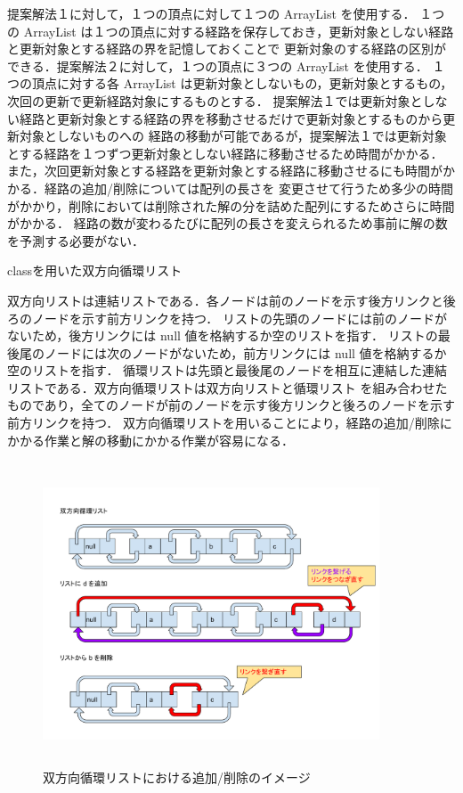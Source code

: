 \documentclass[12pt]{optlab-bachelor}
\begin{document}
提案解法１に対して，１つの頂点に対して１つの ArrayList を使用する．
１つの ArrayList は１つの頂点に対する経路を保存しておき，更新対象としない経路と更新対象とする経路の界を記憶しておくことで
更新対象のする経路の区別ができる．提案解法２に対して，１つの頂点に３つの ArrayList を使用する．
１つの頂点に対する各 ArrayList は更新対象としないもの，更新対象とするもの，次回の更新で更新経路対象にするものとする．
提案解法１では更新対象としない経路と更新対象とする経路の界を移動させるだけで更新対象とするものから更新対象としないものへの
経路の移動が可能であるが，提案解法１では更新対象とする経路を１つずつ更新対象としない経路に移動させるため時間がかかる．
また，次回更新対象とする経路を更新対象とする経路に移動させるにも時間がかかる．経路の追加/削除については配列の長さを
変更させて行うため多少の時間がかかり，削除においては削除された解の分を詰めた配列にするためさらに時間がかかる．
経路の数が変わるたびに配列の長さを変えられるため事前に解の数を予測する必要がない．

\begin{description}
  \item[classを用いた双方向循環リスト]
\end{description}

双方向リストは連結リストである．各ノードは前のノードを示す後方リンクと後ろのノードを示す前方リンクを持つ．
リストの先頭のノードには前のノードがないため，後方リンクには null 値を格納するか空のリストを指す．
リストの最後尾のノードには次のノードがないため，前方リンクには null 値を格納するか空のリストを指す．
循環リストは先頭と最後尾のノードを相互に連結した連結リストである．双方向循環リストは双方向リストと循環リスト
を組み合わせたものであり，全てのノードが前のノードを示す後方リンクと後ろのノードを示す前方リンクを持つ．
双方向循環リストを用いることにより，経路の追加/削除にかかる作業と解の移動にかかる作業が容易になる．

\begin{figure}[htbp]
  \centering
  \caption{双方向循環リストにおける追加/削除のイメージ}
  \includegraphics[height=9.0cm, width=10.0cm]{fig/fig10.pdf}
\end{figure}
\end{document}
